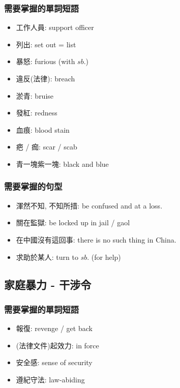 \subsubsection*{需要掌握的單詞短語}
\begin{multicols}{2}
\begin{itemize}
  \itemsep0em
  \item 工作人員: support officer
  \item 列出: set out = list
  \item 暴怒: furious (with $sb.$)
  \item 違反(法律): breach
  \item 淤青: bruise
  \item 發紅: redness
  \item 血痕: blood stain
  \item 疤 / 痂: scar / scab
  \item 青一塊紫一塊: black and blue
\end{itemize}
\end{multicols}

\subsubsection*{需要掌握的句型}
\begin{multicols}{2}
\begin{itemize}
  \itemsep0em
  \item 渾然不知, 不知所措: be confused and at a loss.
  \item 關在監獄: be locked up in jail / gaol
  \item 在中國沒有這回事: there is no such thing in China.
  \item 求助於某人: turn to $sb.$ (for help)
\end{itemize}
\end{multicols}

\subsection{家庭暴力 - 干涉令}
\subsubsection*{需要掌握的單詞短語}
\begin{multicols}{2}
\begin{itemize}
  \itemsep0em
  \item 報復: revenge / get back 
  \item (法律文件)起效力: in force
  \item 安全感: sense of security
  \item 遵紀守法: law-abiding
\end{itemize}
\end{multicols}

